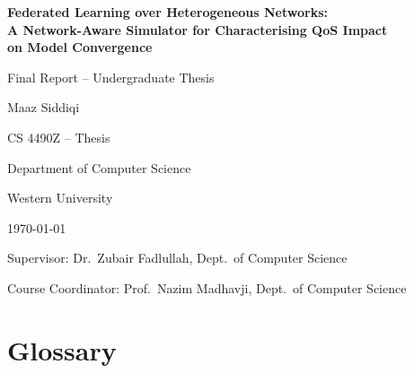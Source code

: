 \documentclass[12pt,a4paper]{report}
\begin{document}
\begin{titlepage}
  \thispagestyle{empty}
  \centering
  \vspace*{1.5cm}
  {\LARGE\bfseries
  Federated Learning over Heterogeneous Networks:\\[0.4em]
  A Network-Aware Simulator for Characterising QoS Impact\\[0.4em]
  on Model Convergence\par}
  \vspace{1.5cm}
  {\large Final Report -- Undergraduate Thesis\par}
  \vspace{1cm}
  {\large Maaz Siddiqi\par}
  \vspace{0.5cm}
  {\large CS 4490Z -- Thesis\par}
  \vspace{0.5cm}
  {\large Department of Computer Science\par}
  \vspace{0.5cm}
  {\large Western University\par}
  \vspace{0.5cm}
  {\large \today\par}
  \vspace{1cm}
  {\large Supervisor: Dr.\ Zubair Fadlullah, Dept.\ of Computer Science\par}
  \vspace{0.5cm}
  {\large Course Coordinator: Prof.\ Nazim Madhavji, Dept.\ of Computer Science\par}
\end{titlepage}

\chapter*{Glossary}
\end{document}
